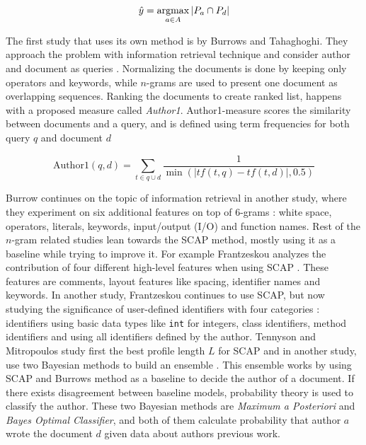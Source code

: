 \begin{equation}
    \hat{y} = \operatorname*{argmax}_{a \in A} |P_a \cap P_d|
\end{equation}

\noindent
The first study that uses its own method is by Burrows and Tahaghoghi. They approach the problem with information retrieval technique and consider author and document as queries \cite{SCANG2007}. Normalizing the documents is done by keeping only operators and keywords, while $n$-grams are used to present one document as overlapping sequences. Ranking the documents to create ranked list, happens with a proposed measure called \emph{Author1}. Author1-measure scores the similarity between documents and a query, and is defined using term frequencies for both query $q$ and document $d$

\begin{equation}
    \text{Author1}(q, d) = \sum\limits_{t \in q \cup d} \dfrac{1}{\min(|tf(t, q) - tf(t, d)|, 0.5)}
\end{equation}

\noindent
Burrow \etal continues on the topic of information retrieval in another study, where they experiment on six additional features on top of 6-grams \cite{AIRTSCAA2009}: white space, operators, literals, keywords, input/output (I/O) and function names. Rest of the $n$-gram related studies lean towards the SCAP method, mostly using it as a baseline while trying to improve it. For example Frantzeskou \etal analyzes the contribution of four different high-level features when using SCAP \cite{ESHPFSCAC2008}. These features are comments, layout features like spacing, identifier names and keywords. In another study, Frantzeskou \etal continues to use SCAP, but now studying the significance of user-defined identifiers with four categories \cite{TSUDIJSCAI2011}: identifiers using basic data types like \texttt{int} for integers, class identifiers, method identifiers and using all identifiers defined by the author. Tennyson and Mitropoulos study first the best profile length $L$ for SCAP \cite{CAPSCAP2014} and in another study, use two Bayesian methods to build an ensemble \cite{ABEC2014}. This ensemble works by using SCAP and Burrows method as a baseline to decide the author of a document. If there exists disagreement between baseline models, probability theory is used to classify the author. These two Bayesian methods are \emph{Maximum a Posteriori} and \emph{Bayes Optimal Classifier}, and both of them calculate probability that author $a$ wrote the document $d$ given data about authors previous work.

